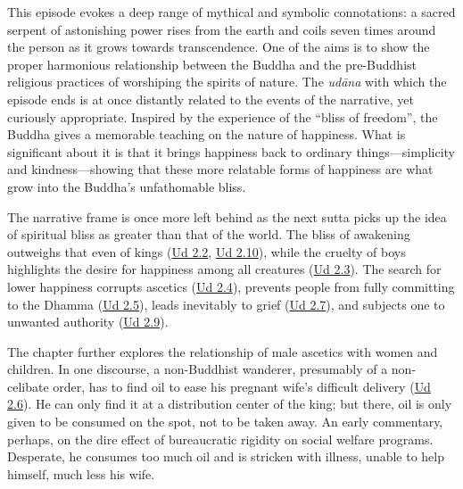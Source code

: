 \documentclass[12pt,openany]{book}%
\begin{document}
This episode evokes a deep range of mythical and symbolic connotations: a sacred serpent of astonishing power rises from the earth and coils seven times around the person as it grows towards transcendence. One of the aims is to show the proper harmonious relationship between the Buddha and the pre-Buddhist religious practices of worshiping the spirits of nature. The \textit{\textsanskrit{udāna}} with which the episode ends is at once distantly related to the events of the narrative, yet curiously appropriate. Inspired by the experience of the “bliss of freedom”, the Buddha gives a memorable teaching on the nature of happiness. What is significant about it is that it brings happiness back to ordinary things—simplicity and kindness—showing that these more relatable forms of happiness are what grow into the Buddha’s unfathomable bliss.

The narrative frame is once more left behind as the next sutta picks up the idea of spiritual bliss as greater than that of the world. The bliss of awakening outweighs that even of kings (\href{https://suttacentral.net/ud2.2/en/sujato}{Ud 2.2}, \href{https://suttacentral.net/ud2.10/en/sujato}{Ud 2.10}), while the cruelty of boys highlights the desire for happiness among all creatures (\href{https://suttacentral.net/ud2.3/en/sujato}{Ud 2.3}). The search for lower happiness corrupts ascetics (\href{https://suttacentral.net/ud2.4/en/sujato}{Ud 2.4}), prevents people from fully committing to the Dhamma (\href{https://suttacentral.net/ud2.5/en/sujato}{Ud 2.5}), leads inevitably to grief (\href{https://suttacentral.net/ud2.7/en/sujato}{Ud 2.7}), and subjects one to unwanted authority (\href{https://suttacentral.net/ud2.9/en/sujato}{Ud 2.9}).

The chapter further explores the relationship of male ascetics with women and children. In one discourse, a non-Buddhist wanderer, presumably of a non-celibate order, has to find oil to ease his pregnant wife’s difficult delivery (\href{https://suttacentral.net/ud2.6/en/sujato}{Ud 2.6}). He can only find it at a distribution center of the king; but there, oil is only given to be consumed on the spot, not to be taken away. An early commentary, perhaps, on the dire effect of bureaucratic rigidity on social welfare programs. Desperate, he consumes too much oil and is stricken with illness, unable to help himself, much less his wife. 
\end{document}
